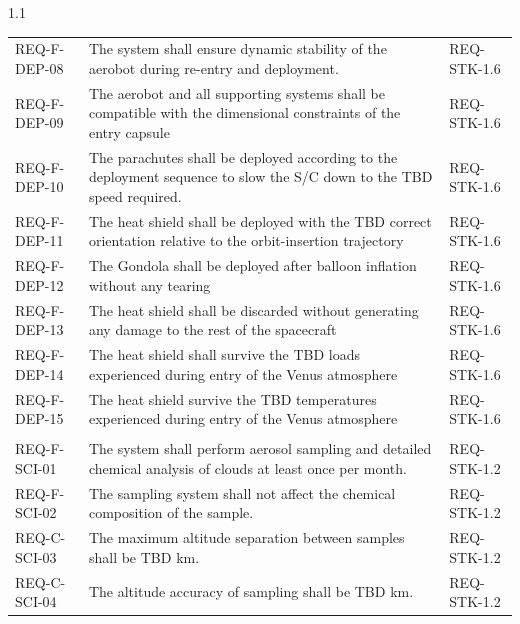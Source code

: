 {{\begin{spacing}{1.1}
\begin{longtable}{@{}
>{\raggedright\arraybackslash}p{}
>{\raggedright\arraybackslash}p{}
>{\raggedright\arraybackslash}p{}
@{}}
REQ-F-DEP-08 &
The system shall ensure dynamic stability of the aerobot during re-entry and deployment. &
REQ-STK-1.6 \\
REQ-F-DEP-09 & The aerobot and all supporting systems shall be compatible with the dimensional constraints of the entry capsule & REQ-STK-1.6 \\
REQ-F-DEP-10 & The parachutes shall be deployed according to the deployment sequence to slow the S/C down to the TBD speed required. & REQ-STK-1.6 \\
REQ-F-DEP-11 & The heat shield shall be deployed with the TBD correct orientation relative to the orbit-insertion trajectory & REQ-STK-1.6 \\
REQ-F-DEP-12  & The Gondola shall be deployed after balloon inflation without any tearing & REQ-STK-1.6 \\
REQ-F-DEP-13 & The heat shield shall be discarded without generating any damage to the rest of the spacecraft & REQ-STK-1.6 \\
REQ-F-DEP-14 & The heat shield shall survive the TBD loads experienced during entry of the Venus atmosphere & REQ-STK-1.6 \\
REQ-F-DEP-15 & The heat shield survive the TBD temperatures experienced during entry of the Venus atmosphere & REQ-STK-1.6 \\
\multicolumn{3}{@{}l}{\textbf{Scientific Goals}} \\
\midrule

REQ-F-SCI-01 &
The system shall perform aerosol sampling and detailed chemical analysis of clouds at least once per month. &
REQ-STK-1.2 \\

REQ-F-SCI-02 &
The sampling system shall not affect the chemical composition of the sample. &
REQ-STK-1.2 \\

REQ-C-SCI-03 &
The maximum altitude separation between samples shall be TBD km. &
REQ-STK-1.2 \\

REQ-C-SCI-04 &
The altitude accuracy of sampling shall be TBD km. &
REQ-STK-1.2 \\


\end{longtable}
\end{spacing}}}
